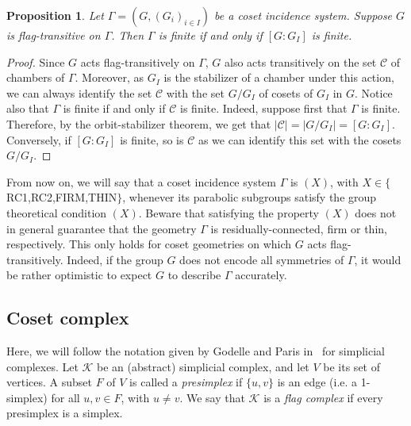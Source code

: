 \documentclass[11pt,letterpaper]{amsart}
\newtheorem{prop}{Proposition}[section]
\newcommand{\KK}{\mathcal{K}}
\begin{document}
\begin{prop}\label{prop:FiniteCosetGeom}
    Let $\Gamma=(G,(G_i)_{i\in I})$ be a coset incidence system.
    Suppose $G$ is flag-transitive on $\Gamma$.
    Then $\Gamma$ is finite if and only if $[G:G_I]$ is finite.
\end{prop}
\begin{proof}
    Since $G$ acts flag-transitively on $\Gamma$, $G$ also acts transitively on the set $\mathcal{C}$ of chambers of $\Gamma$. Moreover, as $G_I$ is the stabilizer of a chamber under this action, we can always identify the set $\mathcal{C}$ with the set $G/G_I$ of cosets of $G_I$ in $G$. 
    Notice also that $\Gamma$ is finite if and only if $\mathcal{C}$ is finite. 
    Indeed, suppose first that $\Gamma$ is finite.
    Therefore, by the orbit-stabilizer theorem, we get that $|\mathcal{C}| = |G / G_I| = [G : G_I]$. Conversely, if $[G : G_I]$ is finite, so is $\mathcal{C}$ as we can identify this set with the cosets $G/G_I$.
\end{proof}


From now on, we will say that a coset incidence system $\Gamma$ is $(X)$, with $X\in\{$RC1,RC2,FIRM,THIN$\}$, whenever its parabolic subgroups satisfy the group theoretical condition $(X)$. Beware that satisfying the property $(X)$ does not in general guarantee that the geometry $\Gamma$ is residually-connected, firm or thin, respectively. This only holds for coset geometries on which $G$ acts flag-transitively. Indeed, if the group $G$ does not encode all symmetries of $\Gamma$, it would be rather optimistic to expect $G$ to describe $\Gamma$ accurately.




\subsection{Coset complex}

Here, we will follow the notation given by Godelle and Paris in~\cite{ParisGodelle2012} for simplicial complexes.
Let $\KK$ be an (abstract) simplicial complex, and let $V$ be its set of vertices. A subset $F$ of $V$ is called a \emph{presimplex} if $\{u,v\}$ is an edge (i.e. a 1-simplex) for all $u,v \in F$, with $u\neq v$. We
say that $\KK$ is a \emph{flag complex} if every presimplex is a simplex.
\end{document}
